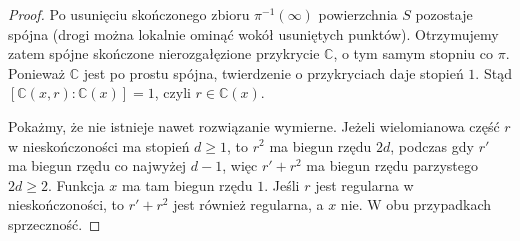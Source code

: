 \begin{proof}
Po usunięciu skończonego zbioru $\pi^{-1}(\infty)$
powierzchnia $S$ pozostaje spójna (drogi można lokalnie
ominąć wokół usuniętych punktów). Otrzymujemy zatem
spójne skończone nierozgałęzione przykrycie $\mathbb C$,
o tym samym stopniu co $\pi$.
Ponieważ $\mathbb C$ jest po prostu spójna, twierdzenie
o przykryciach daje stopień $1$. Stąd
$[\mathbb C(x,r):\mathbb C(x)]=1$, czyli
$r\in\mathbb C(x)$.

Pokażmy, że nie istnieje
nawet rozwiązanie wymierne.
Jeżeli wielomianowa część
$r$ w nieskończoności ma
stopień $d\ge1$, to $r^2$
ma biegun rzędu $2d$,
podczas gdy $r'$ ma biegun
rzędu co najwyżej $d-1$,
więc $r'+r^2$ ma biegun
rzędu parzystego $2d\ge2$.
Funkcja $x$ ma tam
biegun rzędu $1$.
Jeśli $r$ jest regularna
w nieskończoności, to
$r'+r^2$ jest również
regularna, a $x$ nie.
W obu przypadkach sprzeczność.
\end{proof}

